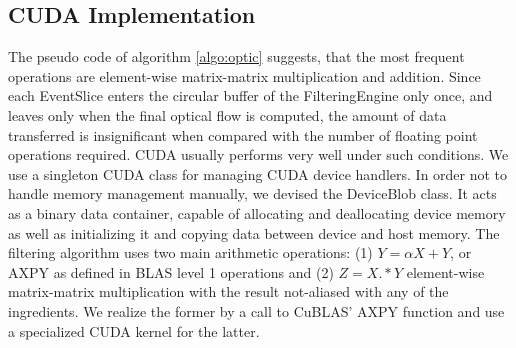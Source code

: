 \subsection{CUDA Implementation}

The pseudo code of algorithm \ref{algo:optic} suggests, that the most frequent operations are element-wise matrix-matrix multiplication and addition.
Since each EventSlice enters the circular buffer of the FilteringEngine only once, and leaves only when the final optical flow is computed, the amount of data transferred is insignificant when compared with the number of floating point operations required.
CUDA usually performs very well under such conditions.
We use a singleton CUDA class for managing CUDA device handlers.
In order not to handle memory management manually, we devised the DeviceBlob class. 
It acts as a binary data container, capable of allocating and deallocating device memory as well as initializing it and copying data between device and host memory. 
The filtering algorithm uses two main arithmetic operations: (1) $Y = \alpha X + Y$, or AXPY as defined in BLAS level 1 operations and (2) $Z = X .* Y$ element-wise matrix-matrix multiplication with the result not-aliased with any of the ingredients. We realize the former by a call to CuBLAS' AXPY function and use a specialized CUDA kernel for the latter.